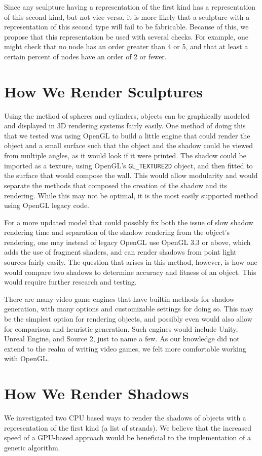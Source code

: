 \documentclass[letter,10pt]{article}
\begin{document}
Since any sculpture having a representation of the first kind has a representation of this second kind, but not vice versa, it is more likely that a sculpture with a representation of this second type will fail to be fabricable. Because of this, we propose that this representation be used with several checks. For example, one might check that no node has an order greater than 4 or 5, and that at least a certain percent of nodes have an order of 2 or fewer.

\section{How We Render Sculptures}
Using the method of spheres and cylinders, objects can be graphically modeled and displayed in 3D rendering systems fairly easily.  One method of doing this that we tested was using OpenGL to build a little engine that could render the object and a small surface such that the object and the shadow could be viewed from multiple angles, as it would look if it were printed.  The shadow could be imported as a texture, using OpenGL's \texttt{GL\_TEXTURE2D} object, and then fitted to the surface that would compose the wall.  This would allow modularity and would separate the methods that composed the creation of the shadow and its rendering.  While this may not be optimal, it is the most easily supported method using OpenGL legacy code.

For a more updated model that could possibly fix both the issue of slow shadow rendering time and separation of the shadow rendering from the object's rendering, one may instead of legacy OpenGL use OpenGL 3.3 or above, which adds the use of fragment shaders, and can render shadows from point light sources fairly easily.  The question that arises in this method, however, is how one would compare two shadows to determine accuracy and fitness of an object.  This would require further research and testing.

There are many video game engines that have builtin methods for shadow generation, with many options and customizable settings for doing so.  This may be the simplest option for rendering objects, and possibly even would also allow for comparison and heuristic generation.  Such engines would include Unity, Unreal Engine, and Source 2, just to name a few.  As our knowledge did not extend to the realm of writing video games, we felt more comfortable working with OpenGL.

\section{How We Render Shadows}
We investigated two CPU based ways to render the shadows of objects with a representation of the first kind (a list of strands). We believe that the increased speed of a GPU-based approach would be beneficial to the implementation of a genetic algorithm.
\end{document}
